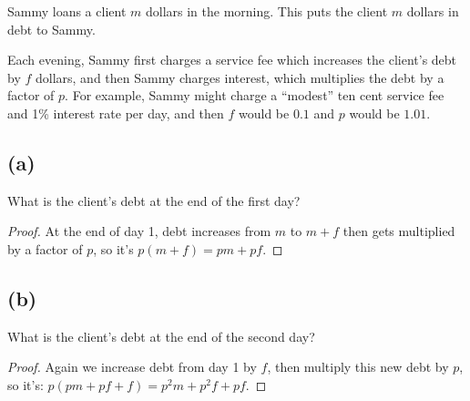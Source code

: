 \documentclass[14pt]{extarticle}
\begin{document}
Sammy loans a client $m$ dollars in the morning. This puts the client $m$ dollars in debt to Sammy.

Each evening, Sammy first charges a service fee which increases the client’s debt by $f$ dollars, and then Sammy charges interest, which multiplies the debt by a factor of $p$. For example, Sammy might charge a “modest” ten cent service fee and 1\% interest rate per day, and then $f$ would be $0.1$ and $p$ would be $1.01$.

\subsection{(a)}
What is the client’s debt at the end of the first day?
\begin{proof}
At the end of day 1, debt increases from $m$ to $m+f$ then gets multiplied by a factor of $p$, so it's $p(m+f) = pm + pf$.
\end{proof}

\subsection{(b)}
What is the client’s debt at the end of the second day?
\begin{proof}
Again we increase debt from day 1 by $f$, then multiply this new debt by $p$, so it's: $p(pm + pf + f) = p^2m + p^2f + pf$.
\end{proof}
\end{document}
